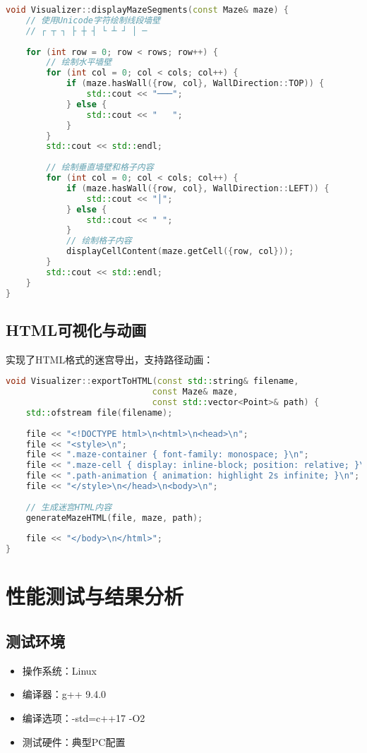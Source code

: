 \documentclass[UTF8]{ctexart}
\begin{document}
\begin{lstlisting}[language=C++]
void Visualizer::displayMazeSegments(const Maze& maze) {
    // 使用Unicode字符绘制线段墙壁
    // ┌ ┬ ┐ ├ ┼ ┤ └ ┴ ┘ │ ─
    
    for (int row = 0; row < rows; row++) {
        // 绘制水平墙壁
        for (int col = 0; col < cols; col++) {
            if (maze.hasWall({row, col}, WallDirection::TOP)) {
                std::cout << "───";
            } else {
                std::cout << "   ";
            }
        }
        std::cout << std::endl;
        
        // 绘制垂直墙壁和格子内容
        for (int col = 0; col < cols; col++) {
            if (maze.hasWall({row, col}, WallDirection::LEFT)) {
                std::cout << "│";
            } else {
                std::cout << " ";
            }
            // 绘制格子内容
            displayCellContent(maze.getCell({row, col}));
        }
        std::cout << std::endl;
    }
}
\end{lstlisting}

\subsection{HTML可视化与动画}

实现了HTML格式的迷宫导出，支持路径动画：

\begin{lstlisting}[language=C++]
void Visualizer::exportToHTML(const std::string& filename, 
                             const Maze& maze, 
                             const std::vector<Point>& path) {
    std::ofstream file(filename);
    
    file << "<!DOCTYPE html>\n<html>\n<head>\n";
    file << "<style>\n";
    file << ".maze-container { font-family: monospace; }\n";
    file << ".maze-cell { display: inline-block; position: relative; }\n";
    file << ".path-animation { animation: highlight 2s infinite; }\n";
    file << "</style>\n</head>\n<body>\n";
    
    // 生成迷宫HTML内容
    generateMazeHTML(file, maze, path);
    
    file << "</body>\n</html>";
}
\end{lstlisting}

\section{性能测试与结果分析}

\subsection{测试环境}
\begin{itemize}
    \item 操作系统：Linux
    \item 编译器：g++ 9.4.0
    \item 编译选项：-std=c++17 -O2
    \item 测试硬件：典型PC配置
\end{itemize}
\end{document}
